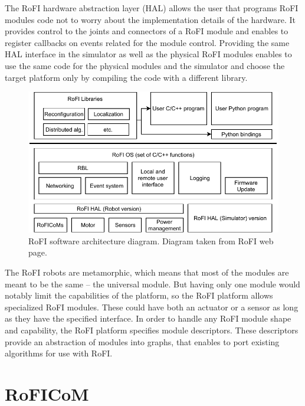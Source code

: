 \documentclass[
  digital, %
  table,   %
  oneside, %
  nolof,     %
  nolot,     %
]{fithesis3}
\begin{document}
The RoFI hardware abstraction layer (HAL)\label{hal} allows the user that programs RoFI modules code not to worry about the implementation details of the hardware.
It provides control to the joints and connectors of a RoFI module and enables to register callbacks on events related for the module control.
Providing the same HAL interface in the simulator as well as the physical RoFI modules enables to use the same code for the physical modules and the simulator and choose the target platform only by compiling the code with a different library.


\begin{figure}
    \centering
    \includegraphics[width=\linewidth]{data/rofi_architecture.pdf}
    \caption{RoFI software architecture diagram. Diagram taken from RoFI web page\cite{rofi-web}.}
    \label{fig:architecture}
\end{figure}

The RoFI robots are metamorphic, which means that most of the modules are meant to be the same -- the universal module.
But having only one module would notably limit the capabilities of the platform, so the RoFI platform allows specialized RoFI modules.
These could have both an actuator or a sensor as long as they have the specified interface.
In order to handle any RoFI module shape and capability, the RoFI platform specifies module descriptors\cite{rofi-thesis}.
These descriptors provide an abstraction of modules into graphs, that enables to port existing algorithms for use with RoFI.

\section{RoFICoM}
\label{roficom}
\end{document}
